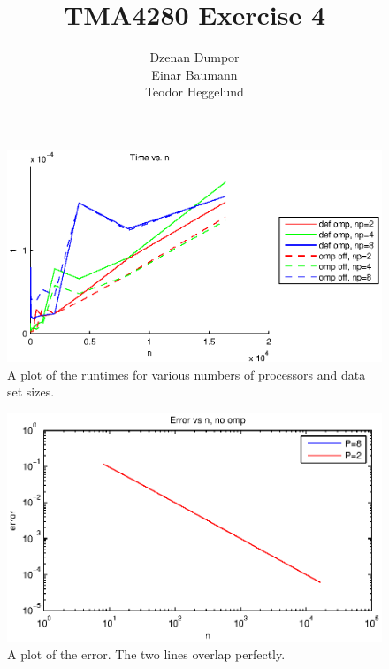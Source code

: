 


\author{Dzenan Dumpor \\ Einar Baumann \\ Teodor Heggelund}
\title{TMA4280 Exercise 4}


\maketitle


\begin{figure}[htbp]
  \centering
  \includegraphics[]{graphics/runtime.eps}
  \caption{A plot of the runtimes for various numbers of processors and data set sizes.}
  \label{fig:runtime}
\end{figure}

\begin{figure}[htbp]
  \centering
  \includegraphics[]{graphics/error.eps}
  \caption{A plot of the error. The two lines overlap perfectly.}
  \label{fig:error}
\end{figure}



